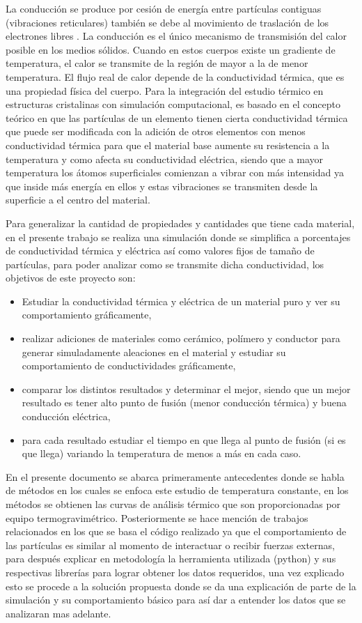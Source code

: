 \documentclass[3pt,twocolumn]{elsarticle}
\begin{document}
La conducción se produce por cesión de energía entre partículas contiguas (vibraciones reticulares) también se debe al movimiento de traslación de los electrones libres \cite{book2}.
La conducción es el único mecanismo de transmisión del calor posible en los medios sólidos. Cuando en estos cuerpos existe un gradiente de temperatura, el calor se transmite de la región de mayor a la de menor temperatura. El flujo real de calor depende de la conductividad térmica, que es una propiedad física del cuerpo. 
Para la integración del estudio térmico en estructuras cristalinas con simulación computacional, es basado en el concepto teórico en que las partículas de un elemento tienen cierta conductividad térmica que puede ser modificada con la adición de otros elementos con menos conductividad térmica para que el material base aumente su resistencia a la temperatura y como afecta su conductividad eléctrica, siendo que a mayor temperatura los átomos superficiales comienzan a vibrar con más intensidad ya que inside más energía en ellos y estas vibraciones se transmiten desde la superficie a el centro del material.

Para generalizar la cantidad de propiedades y cantidades que tiene cada material, en el presente trabajo se realiza una simulación donde se simplifica a porcentajes de conductividad térmica y eléctrica así como valores fijos de tamaño de partículas, para poder analizar como se transmite dicha conductividad, los objetivos de este proyecto son:

\begin{itemize}
    \item Estudiar la conductividad térmica y eléctrica de un material puro y ver su comportamiento gráficamente,
    \item realizar adiciones de materiales como cerámico, polímero y conductor para generar simuladamente aleaciones en el material y estudiar su comportamiento de conductividades gráficamente, 
    \item comparar los distintos resultados y determinar el mejor, siendo que un mejor resultado es tener alto punto de fusión (menor conducción térmica) y buena conducción eléctrica,
    \item para cada resultado estudiar el tiempo en que llega al punto de fusión (si es que llega) variando la temperatura de menos a más en cada caso.
\end{itemize}
En el presente documento se abarca primeramente antecedentes donde se habla de métodos en los cuales se enfoca este estudio de temperatura constante, en los métodos se obtienen las curvas de análisis térmico que son proporcionadas por equipo termogravimétrico. Posteriormente se hace mención de trabajos relacionados en los que se basa el código realizado ya que el comportamiento de las partículas es similar al momento de interactuar o recibir fuerzas externas, para después explicar en metodología la herramienta utilizada (python) y sus respectivas librerías para lograr obtener los datos requeridos, una vez explicado esto se procede a la solución propuesta donde se da una explicación de parte de la simulación y su comportamiento básico para así dar a entender los datos que se analizaran mas adelante. 
\end{document}
